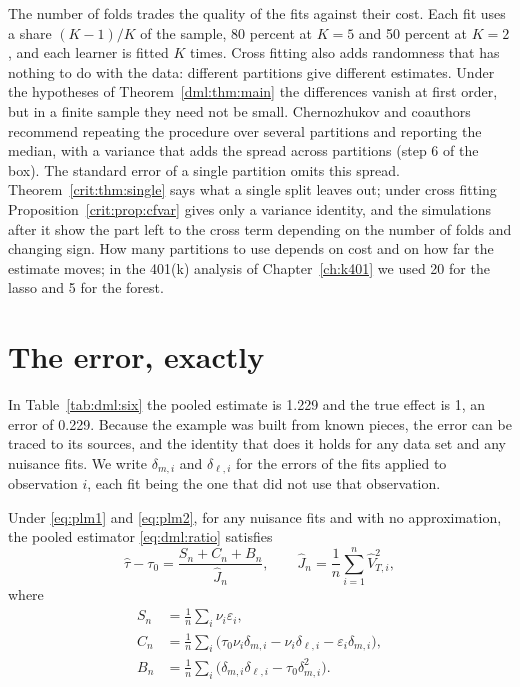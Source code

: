The number of folds trades the quality of the fits against their cost. Each fit uses a share $(K-1)/K$ of the sample, 80 percent at $K = 5$ and 50 percent at $K = 2$, and each learner is fitted $K$ times. Cross fitting also adds randomness that has nothing to do with the data: different partitions give different estimates. Under the hypotheses of Theorem~\ref{dml:thm:main} the differences vanish at first order, but in a finite sample they need not be small. Chernozhukov and coauthors recommend repeating the procedure over several partitions and reporting the median, with a variance that adds the spread across partitions (step 6 of the box). The standard error of a single partition omits this spread. Theorem~\ref{crit:thm:single} says what a single split leaves out; under cross fitting Proposition~\ref{crit:prop:cfvar} gives only a variance identity, and the simulations after it show the part left to the cross term depending on the number of folds and changing sign. How many partitions to use depends on cost and on how far the estimate moves; in the 401(k) analysis of Chapter~\ref{ch:k401} we used 20 for the lasso and 5 for the forest.

\section{The error, exactly}\label{sec:dml:exact}

In Table~\ref{tab:dml:six} the pooled estimate is 1.229 and the true effect is 1, an error of 0.229. Because the example was built from known pieces, the error can be traced to its sources, and the identity that does it holds for any data set and any nuisance fits. We write $\delta_{m,i}$ and $\delta_{\ell,i}$ for the errors of the fits applied to observation $i$, each fit being the one that did not use that observation.

\begin{lemma}\label{dml:lem:exact}
Under \eqref{eq:plm1} and \eqref{eq:plm2}, for any nuisance fits and with no approximation, the pooled estimator \eqref{eq:dml:ratio} satisfies
\begin{equation}
\hat\tau - \tau_0 = \frac{S_n + C_n + B_n}{\hat J_n}, \qquad \hat J_n = \frac{1}{n}\sum_{i=1}^n \hat V_{T,i}^2,
\label{eq:dml:exact}
\end{equation}
where
\begin{align*}
S_n &= \frac{1}{n}\sum_i \nu_i\varepsilon_i, \\
C_n &= \frac{1}{n}\sum_i \bigl(\tau_0\nu_i\delta_{m,i} - \nu_i\delta_{\ell,i} - \varepsilon_i\delta_{m,i}\bigr), \\
B_n &= \frac{1}{n}\sum_i \bigl(\delta_{m,i}\delta_{\ell,i} - \tau_0\delta_{m,i}^2\bigr).
\end{align*}
\end{lemma}

